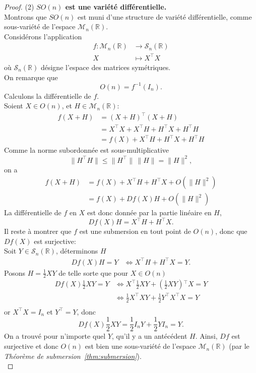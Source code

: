 \documentclass[12pt]{report}
\begin{document}
\begin{proof}
\medskip
(2) \textbf{$SO(n)$ est une variété différentielle.}\\
Montrons que $SO(n)$ est muni d'une structure de variété différentielle, comme sous-variété de l'espace $\mathcal{M}_n(\mathbb{R})$.\\
Considérons l'application
\[
\begin{aligned}
f \colon \mathcal{M}_n(\mathbb{R}) &\longrightarrow \mathcal{S}_n(\mathbb{R})\\
X &\longmapsto X^{\top}X
\end{aligned}
\]
où $\mathcal{S}_n(\mathbb{R})$ désigne l'espace des matrices symétriques.\\
On remarque que
\[
O(n)=f^{-1}(I_n).
\]
Calculons la différentielle de $f$.\\
Soient $X\in O(n)$, et $H\in \mathcal{M}_n(\mathbb{R})$:
\[
\begin{aligned}
f(X+H)&={(X+H)}^{\top}(X+H)\\
&=X^{\top}X+X^{\top}H+H^{\top}X+H^{\top}H\\
&=f(X)+X^{\top}H+H^{\top}X+H^{\top}H
\end{aligned}
\]
Comme la norme subordonnée est sous-multiplicative
\[
\|H^{\top}H\|\leq\|H^{\top}\|\,\|H\|=\|H\|^2,
\]
on a
\[
\begin{aligned}
f(X+H)&=f(X)+X^{\top}H+H^{\top}X+O(\|H\|^2)\\
&=f(X)+Df(X)H+O(\|H\|^2)
\end{aligned}
\]
La différentielle de $f$ en $X$ est donc donnée par la partie linéaire en $H$,
\[
Df(X)H=X^{\top}H+H^{\top}X.
\]
Il reste à montrer que $f$ est une submersion en tout point de $O(n)$, donc que $Df(X)$ est surjective:\\
Soit $Y\in \mathcal{S}_n(\mathbb{R})$, déterminons $H$
\[
\begin{aligned}
Df(X)H=Y&\Leftrightarrow X^{\top}H+H^{\top}X=Y.
\end{aligned}
\]
Posons $H=\frac{1}{2}XY$ de telle sorte que pour $X\in O(n)$
\[
\begin{aligned}
Df(X)\frac{1}{2}XY=Y&\Leftrightarrow X^{\top}\frac{1}{2}XY+(\frac{1}{2}XY){}^{\top}X=Y\\
&\Leftrightarrow \frac{1}{2}X^{\top}XY+\frac{1}{2}Y^{\top}X^{\top}X=Y\\
\end{aligned}
\]
or $X^{\top}X=I_n$ et $Y^{\top}=Y$, donc
\[
Df(X)\frac{1}{2}XY=\frac{1}{2}I_{n}Y+\frac{1}{2}YI_n=Y.
\]
On a trouvé pour n'importe quel $Y$, qu'il y a un antécédent $H$. Ainsi, $Df$ est surjective et donc $O(n)$ est bien une sous-variété de l'espace $\mathcal{M}_n(\mathbb{R})$ (par le \textit{Théorème de submersion~\ref{thm:submersion}}).\\

\end{proof}
\end{document}
